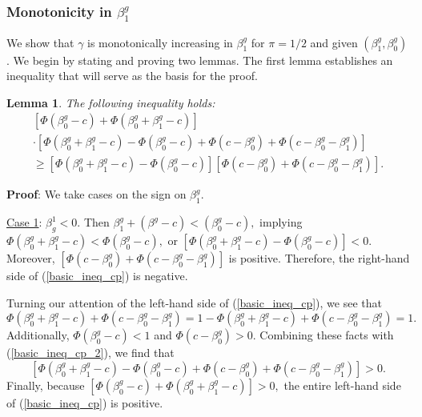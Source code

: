 \documentclass[12pt]{article}
\newtheorem{lemma}{Lemma}
\begin{document}
\subsubsection{Monotonicity in $\beta^g_1$}
We show that $\gamma$ is monotonically increasing in $\beta^g_1$ for $\pi = 1/2$ and given $(\beta^g_1, \beta^g_0)$. We begin by stating and proving two lemmas. The first lemma establishes an inequality that will serve as the basis for the proof.

\begin{lemma}
The following inequality holds: 
\begin{multline}\label{basic_ineq_cp}
\left[\Phi(\beta^g_0 - c) + \Phi(\beta^g_0 + \beta^g_1 - c) \right] \\ \cdot \left[\Phi(\beta_0^g + \beta_1^g - c) - \Phi(\beta_0^g - c) + \Phi(c - \beta^g_0) + \Phi(c - \beta_0^g - \beta_1^g) \right] \\ \geq \left[\Phi(\beta_0^g + \beta_1^g - c) - \Phi(\beta_0^g - c)\right]\left[\Phi(c - \beta^g_0) + \Phi(c - \beta_0^g - \beta_1^g)\right].
\end{multline}
\end{lemma}
\textbf{Proof}: We take cases on the sign on $\beta^g_1$.

\noindent
\underline{Case 1}: $\beta^1_g < 0$. Then $ \beta^g_1 + (\beta^g - c) < (\beta^g_0 - c),$ implying $\Phi(\beta^g_0 + \beta^g_1 - c) < \Phi(\beta^g_0 - c),$ or $[\Phi(\beta^g_0 + \beta^g_1 - c) - \Phi(\beta^g_0 - c)] < 0.$ Moreover, $[\Phi(c - \beta^g_0) + \Phi(c - \beta_0^g - \beta_1^g)]$ is positive. Therefore, the right-hand side of (\ref{basic_ineq_cp}) is negative.

Turning our attention of the left-hand side of (\ref{basic_ineq_cp}), we see that
\begin{equation}\label{basic_ineq_cp_2}
\Phi(\beta^g_0 + \beta^g_1 - c) + \Phi( c - \beta^g_0 - \beta^g_1) = 1 -\Phi(\beta^g_0 + \beta^g_1 - c) + \Phi( c - \beta^g_0 - \beta^g_1) = 1.
\end{equation}
Additionally, $\Phi(\beta^g_0 - c) < 1$ and $ \Phi(c - \beta^g_0) > 0$. Combining these facts with (\ref{basic_ineq_cp_2}), we find that
$$ \left[\Phi(\beta_0^g + \beta_1^g - c) - \Phi(\beta_0^g - c) + \Phi(c - \beta^g_0) + \Phi(c - \beta_0^g - \beta_1^g) \right] > 0. $$ Finally, because $\left[\Phi(\beta^g_0 - c) + \Phi(\beta^g_0 + \beta^g_1 - c) \right] > 0,$ the entire left-hand side of (\ref{basic_ineq_cp}) is positive.
\end{document}
